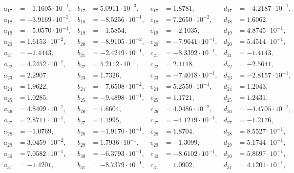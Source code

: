 \begin{align*}
  a_{ 17 } &= -1.1605 \cdot 10^{ -1 }, & b_{ 17 } &= 5.0911 \cdot 10^{ -3 }, & c_{ 17 } &= 1.8781, & d_{ 17 } &= -4.2187 \cdot 10^{ -1 }, \\ 
  a_{ 18 } &= -3.9169 \cdot 10^{ -2 }, & b_{ 18 } &= -8.5256 \cdot 10^{ -1 }, & c_{ 18 } &= 7.2650 \cdot 10^{ -2 }, & d_{ 18 } &= 1.6062, \\ 
  a_{ 19 } &= -5.0570 \cdot 10^{ -1 }, & b_{ 19 } &= -1.5854, & c_{ 19 } &= -2.1035, & d_{ 19 } &= 4.8745 \cdot 10^{ -1 }, \\ 
  a_{ 20 } &= 1.6153 \cdot 10^{ -2 }, & b_{ 20 } &= -8.9105 \cdot 10^{ -2 }, & c_{ 20 } &= -7.9641 \cdot 10^{ -1 }, & d_{ 20 } &= 5.4514 \cdot 10^{ -1 }, \\ 
  a_{ 21 } &= -1.4443, & b_{ 21 } &= -2.4249 \cdot 10^{ -1 }, & c_{ 21 } &= -8.3392 \cdot 10^{ -1 }, & d_{ 21 } &= -1.4143, \\ 
  a_{ 22 } &= 4.2452 \cdot 10^{ -1 }, & b_{ 22 } &= 5.2112 \cdot 10^{ -1 }, & c_{ 22 } &= 2.1118, & d_{ 22 } &= -2.5641, \\ 
  a_{ 23 } &= 2.2907, & b_{ 23 } &= 1.7326, & c_{ 23 } &= -7.4018 \cdot 10^{ -1 }, & d_{ 23 } &= -2.8157 \cdot 10^{ -1 }, \\ 
  a_{ 24 } &= 1.9622, & b_{ 24 } &= -7.6508 \cdot 10^{ -2 }, & c_{ 24 } &= 5.2550 \cdot 10^{ -1 }, & d_{ 24 } &= 1.2043, \\ 
  a_{ 25 } &= 1.0285, & b_{ 25 } &= -9.4898 \cdot 10^{ -1 }, & c_{ 25 } &= 1.1721, & d_{ 25 } &= 1.2431, \\ 
  a_{ 26 } &= 4.8409 \cdot 10^{ -1 }, & b_{ 26 } &= 1.6604, & c_{ 26 } &= 4.0486 \cdot 10^{ -2 }, & d_{ 26 } &= -4.4705 \cdot 10^{ -1 }, \\ 
  a_{ 27 } &= 2.8711 \cdot 10^{ -1 }, & b_{ 27 } &= 1.1995, & c_{ 27 } &= -4.1219 \cdot 10^{ -1 }, & d_{ 27 } &= -1.2176, \\ 
  a_{ 28 } &= -1.0769, & b_{ 28 } &= -1.9170 \cdot 10^{ -1 }, & c_{ 28 } &= 1.8704, & d_{ 28 } &= 8.5527 \cdot 10^{ -1 }, \\ 
  a_{ 29 } &= 3.0459 \cdot 10^{ -2 }, & b_{ 29 } &= 1.7936 \cdot 10^{ -1 }, & c_{ 29 } &= -1.3099, & d_{ 29 } &= 5.1744 \cdot 10^{ -1 }, \\ 
  a_{ 30 } &= 7.0582 \cdot 10^{ -1 }, & b_{ 30 } &= -6.3793 \cdot 10^{ -1 }, & c_{ 30 } &= -8.6102 \cdot 10^{ -1 }, & d_{ 30 } &= 5.8697 \cdot 10^{ -1 }, \\ 
  a_{ 31 } &= -1.4201, & b_{ 31 } &= -8.7379 \cdot 10^{ -1 }, & c_{ 31 } &= 1.0902, & d_{ 31 } &= 4.1201 \cdot 10^{ -1 }, \\ 

\end{align*}
